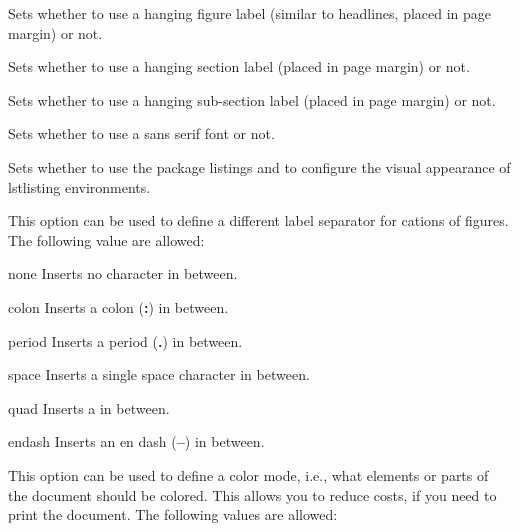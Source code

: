 \documentclass{ltxdockit}
\begin{document}
\begin{optionlist}


Sets whether to use a hanging figure label (similar to headlines, placed in page margin) or not.


Sets whether to use a hanging section label (placed in page margin) or not.


Sets whether to use a hanging sub-section label (placed in page margin) or not.


Sets whether to use a sans serif font or not.


Sets whether to use the package listings and to configure the visual appearance of lstlisting environments.


This option can be used to define a different label separator for cations of figures. The following value are allowed:

\begin{valuelist}
\item[none] Inserts no character in between.
\item[colon] Inserts a colon (\textbf{:}) in between.
\item[period] Inserts a period (\textbf{.}) in between.
\item[space] Inserts a single space character in between.
\item[quad] Inserts a \cmd{\\quad} in between.
\item[endash] Inserts an en dash (\textbf{--}) in between.
\end{valuelist}


This option can be used to define a color mode, i.e., what elements or parts of the document should be colored.
This allows you to reduce costs, if you need to print the document.
The following values are allowed:


\end{optionlist}
\end{document}
